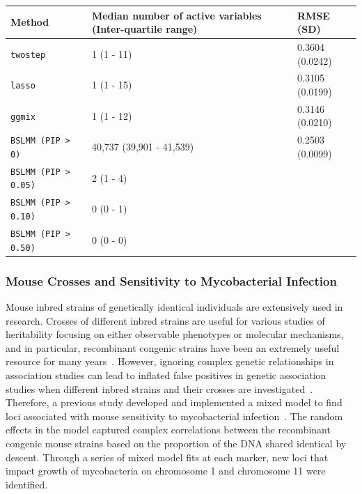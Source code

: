 \documentclass[12pt,letter]{article}\usepackage[]{graphicx}\usepackage[]{color}
\begin{document}
\begin{minipage}{\linewidth}
	\bigskip
	 \label{tab:GAW20-prediction-RMSE-activeVariable}
	\begin{tabular}{ C{1.8in} C{3.5in} C{1.3in}}\toprule[1.5pt]
		\bf Method & \bf Median number of active variables (Inter-quartile range) & \bf RMSE (SD) \\\midrule
		\texttt{twostep} & 1 (1 - 11) & 0.3604 (0.0242) \\
		\texttt{lasso} & 1 (1 - 15) & 0.3105 (0.0199) \\
		\texttt{ggmix} & 1 (1 - 12) & 0.3146 (0.0210) \\
		\texttt{BSLMM (PIP > 0) } & 40,737 (39,901 - 41,539) & 0.2503 (0.0099)\\
		\texttt{BSLMM (PIP > 0.05)} & 2 (1 - 4) & \\
		\texttt{BSLMM (PIP > 0.10)} & 0 (0 - 1)  & \\
		\texttt{BSLMM (PIP > 0.50)} & 0 (0 - 0)  & \\
		\bottomrule[1.25pt]
		\end {tabular}\par
		\bigskip
	\end{minipage}

\subsubsection{Mouse Crosses and Sensitivity to Mycobacterial Infection}

Mouse inbred strains of genetically identical individuals are extensively used in research.
Crosses of different inbred strains are useful for various studies of heritability focusing on either observable phenotypes or molecular mechanisms, and in particular, recombinant congenic strains have been an extremely useful resource for many years~\citep{fortin2001recombinant}.
However, ignoring complex genetic relationships in association studies can lead to inflated false positives in genetic association studies when different inbred strains and their crosses are investigated~\citep{bennett2010high,flint2012genome,cheng2010genome}.
Therefore, a previous study developed and implemented a mixed model to find loci associated with mouse sensitivity to mycobacterial infection~\citep{di2010strain}. The random effects in the model captured complex correlations between the recombinant congenic mouse strains based on the proportion of the DNA shared identical by descent. Through a series of mixed model fits at each marker, new loci that impact growth of mycobacteria on chromosome 1 and chromosome 11 were identified.
\end{document}
